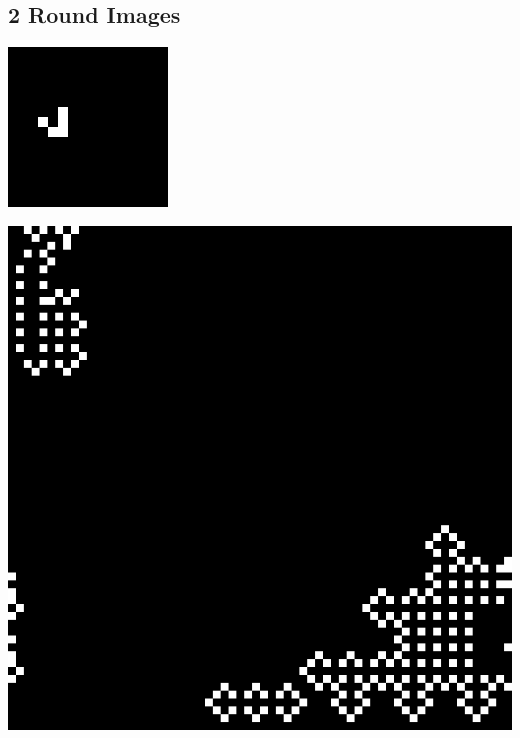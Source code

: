 \documentclass[11pt, oneside]{article}
\newenvironment{Figure}
  {\par\medskip\noindent\minipage{\linewidth}}
  {\endminipage\par\medskip}
\begin{document}
\subsection{2 Round Images}
\begin{multicols}{3}

\begin{Figure}
\includegraphics[width=\linewidth]{images/16x16_2_1.png}
\end{Figure}

\begin{Figure}
\includegraphics[width=\linewidth]{images/64x64_2_1.png}
\end{Figure}



\end{multicols}
\end{document}

